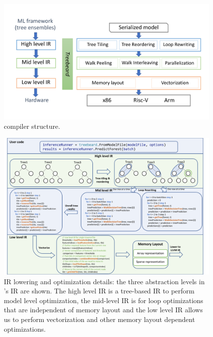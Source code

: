 
\begin{figure}[htb]
  \centering
  \includegraphics[width=\linewidth]{figures/compiler}
  \caption{\Treebeard{} compiler structure.}
  \label{Fig:CompilerStructure}
\end{figure}

\begin{figure}[htb]
  \centering
  \includegraphics[width=\linewidth]{figures/OverviewExample_New.pdf}
  \vskip 10pt
  \caption{\Treebeard{} IR lowering and optimization details: the three abstraction levels in \Treebeard{}'s IR are shown. The
           high level IR is a tree-based IR to perform model level optimization, the mid-level IR is for
           loop optimizations that are independent of memory layout and the low level IR allows us to perform
           vectorization and other memory layout dependent optimizations.}
  \label{Fig:Overview}
\end{figure}



